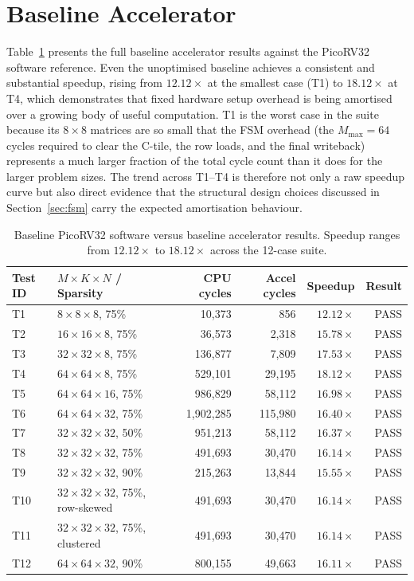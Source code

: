 \section{Baseline Accelerator}

Table~\ref{tab:baseline-results} presents the full baseline accelerator
results against the PicoRV32 software reference. Even the unoptimised
baseline achieves a consistent and substantial speedup, rising from
$12.12\times$ at the smallest case (T1) to $18.12\times$ at T4, which
demonstrates that fixed hardware setup overhead is being amortised over
a growing body of useful computation. T1 is the worst case in the suite
because its $8 \times 8$ matrices are so small that the FSM overhead (the
$M_{\mathrm{max}} = 64$ cycles required to clear the C-tile, the row
loads, and the final writeback) represents a much larger fraction of the
total cycle count than it does for the larger problem sizes. The trend
across T1--T4 is therefore not only a raw speedup curve but also direct
evidence that the structural design choices discussed in
Section~\ref{sec:fsm} carry the expected amortisation behaviour.

\begin{table}[htbp]
  \centering
  \small
  \begin{tabular}{lp{2.6cm}rrrr}
  \toprule
  Test ID & $M \times K \times N$ / Sparsity & CPU cycles & Accel cycles & Speedup & Result \\
  \midrule
  T1  & $8 \times 8 \times 8$, 75\%    & 10,373   &    856 & $12.12\times$ & PASS \\
  T2  & $16 \times 16 \times 8$, 75\%  & 36,573   &  2,318 & $15.78\times$ & PASS \\
  T3  & $32 \times 32 \times 8$, 75\%  & 136,877  &  7,809 & $17.53\times$ & PASS \\
  T4  & $64 \times 64 \times 8$, 75\%  & 529,101  & 29,195 & $18.12\times$ & PASS \\
  T5  & $64 \times 64 \times 16$, 75\% & 986,829  & 58,112 & $16.98\times$ & PASS \\
  T6  & $64 \times 64 \times 32$, 75\% & 1,902,285 & 115,980 & $16.40\times$ & PASS \\
  T7  & $32 \times 32 \times 32$, 50\% & 951,213  & 58,112 & $16.37\times$ & PASS \\
  T8  & $32 \times 32 \times 32$, 75\% & 491,693  & 30,470 & $16.14\times$ & PASS \\
  T9  & $32 \times 32 \times 32$, 90\% & 215,263  & 13,844 & $15.55\times$ & PASS \\
  T10 & $32 \times 32 \times 32$, 75\%, row-skewed & 491,693 & 30,470 & $16.14\times$ & PASS \\
  T11 & $32 \times 32 \times 32$, 75\%, clustered  & 491,693 & 30,470 & $16.14\times$ & PASS \\
  T12 & $64 \times 64 \times 32$, 90\% & 800,155  & 49,663 & $16.11\times$ & PASS \\
  \bottomrule
  \end{tabular}
  \caption{Baseline PicoRV32 software versus baseline accelerator results.
           Speedup ranges from $12.12\times$ to $18.12\times$ across the
           12-case suite.}
  \label{tab:baseline-results}
\end{table}

